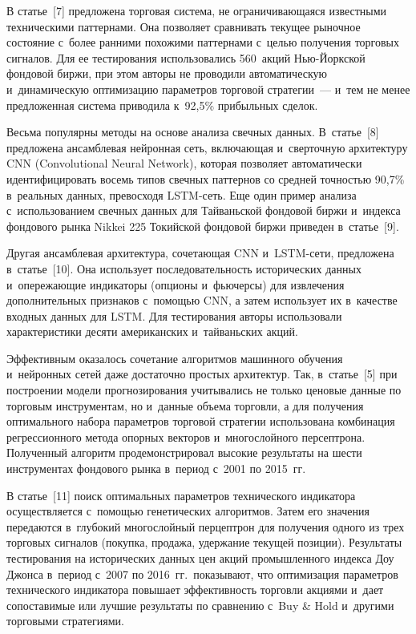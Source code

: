 {\begin{multicols}{2}
  В статье~[7] предложена торговая система, не ограничивающаяся известными 
техническими паттернами. Она позволяет сравнивать текущее рыночное состояние с~более 
ранними похожими паттернами с~целью получения торговых сигналов. Для ее тестирования 
использовались 560~акций Нью-Йорк\-ской фондовой биржи, при этом авторы не проводили 
автоматическую и~динамическую оптимизацию параметров торговой стратегии~--- и~тем не 
менее предложенная система приводила к~92,5\% прибыльных сделок.
  
  Весьма популярны методы на основе анализа свечных данных. В~статье~[8] предложена 
ан\-самб\-ле\-вая нейронная сеть, включающая и~сверточную архитектуру CNN (Convolutional 
Neural Network), которая позволяет автоматически идентифицировать восемь типов свечных 
паттернов со средней точностью 90,7\% в~реальных данных, превосходя LSTM-сеть. Еще 
один пример анализа с~использованием свечных данных для Тайваньской фондовой биржи 
и~индекса фондового рынка Nikkei 225 Токийской фондовой биржи приведен в~статье~[9].
  
  Другая ансамблевая архитектура, сочетающая CNN и~LSTM-се\-ти, предложена 
  в~статье~[10]. Она использует последовательность исторических данных и~опережающие 
индикаторы (опционы и~фьючерсы) для извлечения дополнительных признаков с~по\-мощью 
CNN, а затем использует их в~качестве входных данных для LSTM. Для тестирования авторы 
использовали характеристики десяти американских и~тайваньских акций. 
  
  Эффективным оказалось сочетание алгоритмов машинного обучения и~нейронных сетей 
даже достаточно простых архитектур. Так, в~статье~[5] при построении модели 
прогнозирования учитывались не только ценовые данные по торговым инструментам, но 
и~данные объема торговли, а для получения оптимального набора параметров торговой 
стратегии использована комбинация регрессионного метода опорных векторов 
и~многослойного персептрона. Полученный алгоритм продемонстрировал высокие результаты 
на шести инструментах фондового рынка в~период с~2001 по 2015~гг.

   
  
  В статье~[11] поиск оптимальных параметров технического индикатора осуществляется 
  с~по\-мощью генетических алгоритмов. Затем его значения передаются в~глубокий 
многослойный перцептрон для получения одного из трех торговых сигналов (покупка, продажа, 
удержание текущей позиции). Результаты тестирования на исторических данных цен акций 
промышленного индекса Доу Джонса в~период с~2007 по 2016~гг.\ показывают, что 
оптимизация параметров технического индикатора повышает эффективность торговли 
акциями и~дает сопоставимые или лучшие результаты по сравнению с~Buy \& Hold и~другими торговыми стратегиями. 
  

\end{multicols}}
